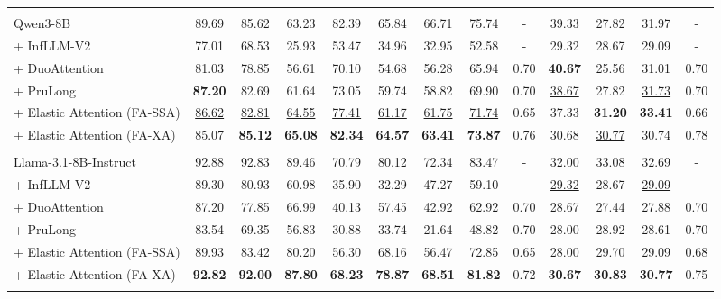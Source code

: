 \begin{table}[t]
{\begin{tabular}{l | c c c c c c | c | c | c c | c | c}
\arrayrulecolor{black}\midrule
\rowcolor{blue!25}
\multicolumn{13}{c}{\textbf{Qwen3-8B backbone model}} \\
\arrayrulecolor{black!20}\midrule
Qwen3-8B & 89.69 & 85.62 & 63.23 & 82.39 & 65.84 & 66.71 & 75.74 & - & 39.33 & 27.82 & 31.97 & - \\
+ InfLLM-V2 & 77.01 & 68.53 & 25.93 & 53.47 & 34.96 & 32.95 & 52.58 & - & 29.32 & 28.67 & 29.09 & -\\
+ DuoAttention & 81.03 & 78.85 & 56.61 & 70.10 & 54.68 & 56.28 & 65.94 & 0.70 & \textbf{40.67} & 25.56 & 31.01 & 0.70\\
+ PruLong & \textbf{87.20} & 82.69 & 61.64 & 73.05 & 59.74 & 58.82 & 69.90 & 0.70 & \underline{38.67} & 27.82 & \underline{31.73} & 0.70\\
\arrayrulecolor{black!40}\midrule
+ Elastic Attention (FA-SSA) & \underline{86.62} & \underline{82.81} & \underline{64.55} & \underline{77.41} & \underline{61.17} & \underline{61.75} & \underline{71.74} & 0.65 & 37.33 & \textbf{31.20} & \textbf{33.41} & 0.66\\
+ Elastic Attention (FA-XA) & 85.07 & \textbf{85.12} & \textbf{65.08} & \textbf{82.34} & \textbf{64.57} & \textbf{63.41} & \textbf{73.87} & 0.76 & 30.68 & \underline{30.77} & 30.74 & 0.78\\

\arrayrulecolor{black}\midrule
\rowcolor{cyan!20}
\multicolumn{13}{c}{\textbf{Llama-3.1-8B-Instruct backbone model}} \\
\arrayrulecolor{black!20}\midrule
Llama-3.1-8B-Instruct & 92.88 & 92.83 & 89.46 & 70.79 & 80.12 & 72.34 & 83.47 & - & 32.00 & 33.08 & 32.69 & - \\
+ InfLLM-V2 & 89.30 & 80.93 & 60.98 & 35.90 & 32.29 & 47.27 & 59.10 & - & \underline{29.32} & 28.67 & \underline{29.09} & - \\
+ DuoAttention & 87.20 & 77.85 & 66.99 & 40.13 & 57.45 & 42.92 & 62.92 & 0.70 & 28.67 & 27.44 & 27.88 & 0.70 \\
+ PruLong & 83.54 & 69.35 & 56.83 & 30.88 & 33.74 & 21.64 & 48.82 & 0.70 & 28.00 & 28.92 & 28.61 & 0.70\\
\arrayrulecolor{black!40}\midrule
+ Elastic Attention (FA-SSA) & \underline{89.93} & \underline{83.42} & \underline{80.20} & \underline{56.30} & \underline{68.16} & \underline{56.47} & \underline{72.85} & 0.65 & 28.00 & \underline{29.70} & \underline{29.09} & 0.68\\
+ Elastic Attention (FA-XA) & \textbf{92.82} & \textbf{92.00} & \textbf{87.80} & \textbf{68.23} & \textbf{78.87} & \textbf{68.51} & \textbf{81.82} & 0.72 & \textbf{30.67} & \textbf{30.83} & \textbf{30.77} & 0.75 \\
\arrayrulecolor{black}\bottomrule
\end{tabular}
}
\vspace{-0.5em}
\label{tab:ruler_lb2_result}
\end{table}